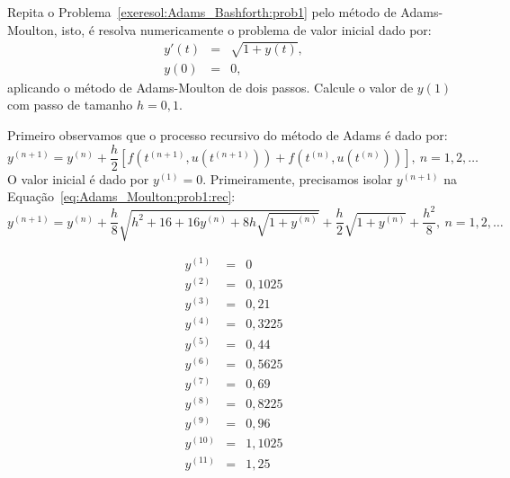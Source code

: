 \begin{exeresol}\label{exeresol:Adams_Moulton:prob1} Repita o Problema~\ref{exeresol:Adams_Bashforth:prob1} pelo método de Adams-Moulton, isto, é  resolva numericamente o problema de valor inicial dado por:
\begin{eqnarray}
 y'(t)&=& \sqrt{1+y(t)},\\
 y(0)&=& 0,
\end{eqnarray}
aplicando o método de Adams-Moulton de dois passos. Calcule o valor de $y(1)$ com passo de tamanho $h=0,1$.
\end{exeresol}
\begin{resol}
Primeiro observamos que o processo recursivo do método de Adams é dado por:
\begin{equation}\label{eq:Adams_Moulton:prob1:rec}
  y^{(n+1)}=y^{(n)}+\frac{h}{2}\left[f\left(t^{(n+1)},u(t^{(n+1)})\right)+f\left(t^{(n)},u(t^{(n)})\right)\right],~n=1,2,\ldots
 \end{equation}
O valor inicial é dado por $y^{(1)}=0$. Primeiramente, precisamos isolar $y^{(n+1)}$ na Equação~\ref{eq:Adams_Moulton:prob1:rec}:
\begin{equation}
  y^{(n+1)}=y^{(n)}+\frac{h}{8} \sqrt {{h}^{2}+16+16y^{(n)}+8h\sqrt {1+y^{(n)}}} +\frac{h}{2}\sqrt {1+y^{(n)}}+\frac{h^2}{8},~n=1,2,\ldots
 \end{equation}

  \begin{eqnarray}
 y^{(1)}&=&0\\
 y^{(2)}&=&0,1025\\
y^{(3)}&=&0,21\\
y^{(4)}&=&0,3225\\
y^{(5)}&=&0,44\\
y^{(6)}&=&0,5625\\
y^{(7)}&=&0,69\\
y^{(8)}&=&0,8225\\
y^{(9)}&=&0,96\\
y^{(10)}&=&1,1025\\
y^{(11)}&=&1,25
\end{eqnarray}

\end{resol}


